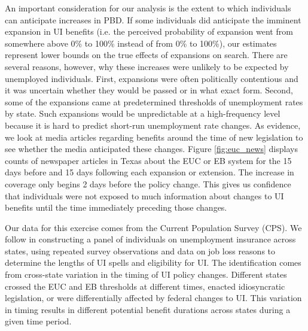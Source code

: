 \documentclass[12pt]{article}
\begin{document}
\begin{spacing}{2}
An important consideration for our analysis is the extent to which individuals can anticipate increases in PBD. If some individuals did anticipate the imminent expansion in UI benefits (i.e. the perceived probability of expansion went from somewhere above 0\% to 100\% instead of from 0\% to 100\%), our estimates represent lower bounds on the true effects of expansions on search. There are several reasons, however, why these increases were unlikely to be expected by unemployed individuals. First, expansions were often politically contentious and it was uncertain whether they would be passed or in what exact form. Second, some of the expansions came at predetermined thresholds of unemployment rates by state. Such expansions would be unpredictable at a high-frequency level because it is hard to predict short-run unemployment rate changes. As evidence, we look at media articles regarding benefits around the time of new legislation to see whether the media anticipated these changes. Figure \ref{fig:euc_news} displays counts of newspaper articles in Texas about the EUC or EB system for the 15 days before and 15 days following each expansion or extension. The increase in coverage only begins 2 days before the policy change. This gives us confidence that individuals were not exposed to much information about changes to UI benefits until the time immediately preceding those changes.

Our data for this exercise comes from the Current Population Survey (CPS). We follow \citet{Rothstein2011} in constructing a panel of individuals on unemployment insurance across states, using repeated survey observations and data on job loss reasons to determine the lengths of UI spells and eligibility for UI. The identification comes from cross-state variation in the timing of UI policy changes. Different states crossed the EUC and EB thresholds at different times, enacted idiosyncratic legislation, or were differentially affected by federal changes to UI. This variation in timing results in different potential benefit durations across states during a given time period.


\end{spacing}
\end{document}
